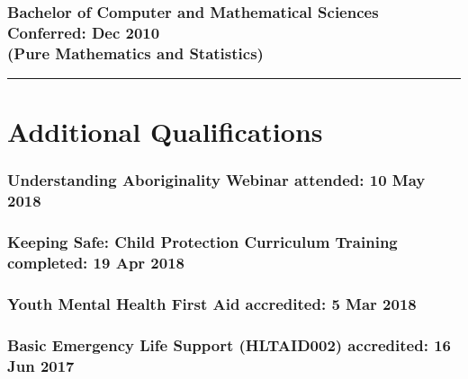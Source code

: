 \documentclass[a4paper,12pt]{report}
\begin{document}
\subsubsection*{Bachelor of Computer and Mathematical Sciences \hfill Conferred: Dec 2010 \\ (Pure Mathematics and Statistics)}

\vspace{0.4cm}
\hrule
\vspace{0.6cm}

\section*{Additional Qualifications}

\subsubsection*{Understanding Aboriginality Webinar \hfill attended: 10 May 2018}

\subsubsection*{Keeping Safe: Child Protection Curriculum Training \hfill completed: 19 Apr 2018}

\subsubsection*{Youth Mental Health First Aid \hfill accredited: 5 Mar 2018}

%
%

\subsubsection*{Basic Emergency Life Support (HLTAID002) \hfill accredited: 16 Jun 2017}
\end{document}
